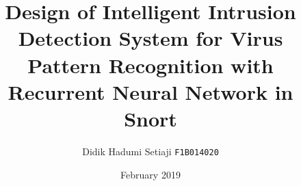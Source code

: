 \documentclass[12pt,indonesia]{book}
\author{
Didik Hadumi Setiaji
\texttt{F1B014020}
}
\title{
Design of Intelligent Intrusion Detection System for Virus Pattern Recognition with Recurrent Neural Network in Snort
}
\date{February 2019}
\begin{document}

\frontmatter
\tableofcontents
\clearpage
\listoffigures
\clearpage
\listoftables

\singlespacing
\mainmatter





\newpage

\end{document}
